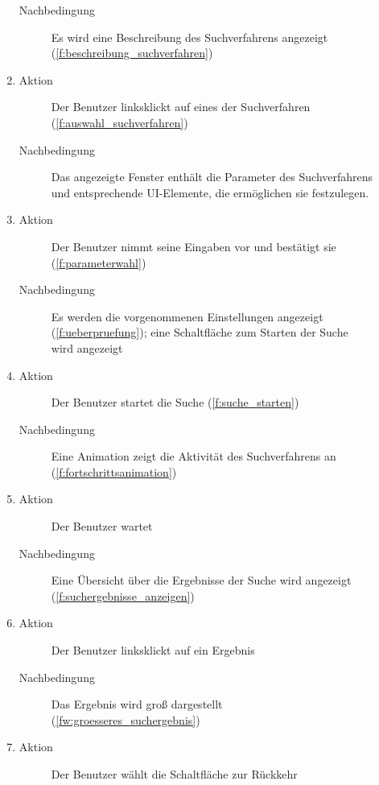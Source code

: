 \begin{description}
\begin{enumerate}
\begin{description}
			\item[Nachbedingung] Es wird eine Beschreibung des Suchverfahrens angezeigt (\ref{f:beschreibung_suchverfahren})
		\end{description}
		\item
		\begin{description}
			\item[Aktion] Der Benutzer linksklickt auf eines der Suchverfahren (\ref{f:auswahl_suchverfahren})
			\item[Nachbedingung] Das angezeigte Fenster enthält die Parameter des Suchverfahrens und entsprechende UI-Elemente, die ermöglichen sie festzulegen.
		\end{description}
		\item
		\begin{description}
			\item[Aktion] Der Benutzer nimmt seine Eingaben vor und bestätigt sie (\ref{f:parameterwahl})
			\item[Nachbedingung] Es werden die vorgenommenen Einstellungen angezeigt (\ref{f:ueberpruefung}); eine Schaltfläche zum Starten der Suche wird angezeigt
		\end{description}
		\item
		\begin{description}
			\item[Aktion] Der Benutzer startet die Suche (\ref{f:suche_starten})
			\item[Nachbedingung] Eine Animation zeigt die Aktivität des Suchverfahrens an (\ref{f:fortschrittsanimation})
		\end{description}
		\item
		\begin{description}
			\item[Aktion] Der Benutzer wartet
			\item[Nachbedingung] Eine Übersicht über die Ergebnisse der Suche wird angezeigt (\ref{f:suchergebnisse_anzeigen})
		\end{description}
		\item
		\begin{description}
			\item[Aktion] Der Benutzer linksklickt auf ein Ergebnis
			\item[Nachbedingung] Das Ergebnis wird groß dargestellt (\ref{fw:groesseres_suchergebnis})
		\end{description}
		\item
		\begin{description}
			\item[Aktion] Der Benutzer wählt die Schaltfläche zur Rückkehr

\end{description}
\end{enumerate}
\end{description}

